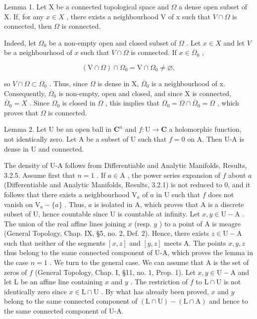 
Lemma 1. Let X be a connected topological space and \(\Omega\) a dense open subset of X. If, for any \(x \in X\) , there exists a neighbourhood V of x such that \(V \cap \Omega\) is connected, then \(\Omega\) is connected.

Indeed, let \(\Omega_0\) be a non-empty open and closed subset of \(\Omega\) . Let \(x \in X\) and let \(V\) be a neighbourhood of \(x\) such that \(V \cap \Omega\) is connected. If \(x \in \overline{\Omega}_0\) ,

\[
(\mathrm{V} \cap \Omega) \cap \Omega_ {0} = \mathrm{V} \cap \Omega_ {0} \neq \varnothing ,
\]

so \(V \cap \Omega \subset \Omega_{0}\) . Thus, since \(\Omega\) is dense in X, \(\overline{\Omega}_{0}\) is a neighbourhood of x. Consequently, \(\overline{\Omega}_{0}\) is non-empty, open and closed, and since X is connected, \(\overline{\Omega}_{0} = X\) . Since \(\Omega_{0}\) is closed in \(\Omega\) , this implies that \(\Omega_{0} = \Omega \cap \overline{\Omega}_{0} = \Omega\) , which proves that \(\Omega\) is connected.

Lemma 2. Let U be an open ball in \(\mathbf{C}^n\) and \(f: \mathrm{U} \to \mathbf{C}\) a holomorphic function, not identically zero. Let A be a subset of U such that \(f = 0\) on A. Then U-A is dense in U and connected.

The density of U-A follows from Differentiable and Analytic Manifolds, Results, 3.2.5. Assume first that \(n = 1\) . If \(a \in \mathrm{A}\) , the power series expansion of \(f\) about \(a\) (Differentiable and Analytic Manifolds, Results, 3.2.1) is not reduced to 0, and it follows that there exists a neighbourhood \(\mathrm{V}_a\) of \(a\) in U such that \(f\) does not vanish on \(\mathrm{V}_a - \{a\}\) . Thus, \(a\) is isolated in A, which proves that A is a discrete subset of U, hence countable since U is countable at infinity. Let \(x, y \in \mathrm{U} - \mathrm{A}\) . The union of the real affine lines joining \(x\) (resp. \(y\) ) to a point of A is meagre (General Topology, Chap. IX, §5, no. 2, Def. 2). Hence, there exists \(z \in \mathrm{U} - \mathrm{A}\) such that neither of the segments \([x, z]\) and \([y, z]\) meets A. The points \(x, y, z\) thus belong to the same connected component of U-A, which proves the lemma in the case \(n = 1\) . We turn to the general case. We can assume that A is the set of zeros of \(f\) (General Topology, Chap. I, §11, no. 1, Prop. 1). Let \(x, y \in \mathrm{U} - \mathrm{A}\) and let L be an affine line containing \(x\) and \(y\) . The restriction of \(f\) to \(\mathrm{L} \cap \mathrm{U}\) is not identically zero since \(x \in \mathrm{L} \cap \mathrm{U}\) . By what has already been proved, \(x\) and \(y\) belong to the same connected component of \((\mathrm{L} \cap \mathrm{U}) - (\mathrm{L} \cap \mathrm{A})\) and hence to the same connected component of U-A.

